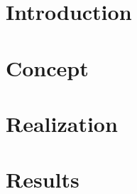 \documentclass[toc=listofnumbered]{doku-tpl}
\begin{document}
        \setcounter{page}{1}
        
			
		\clearpage
		

    	\clearpage
    	\vspace*{-10mm}
    	\tableofcontents
    	
%			  	
        \clearpage
        \fancyhead[L]{\partname \ \thepart \ - \parttitle}	  
        
        
  				
        \part{Introduction}
        
        \clearpage
        
        \part{Concept}
        
        \clearpage
        
                
        \part{Realization}
        
        \clearpage
        
        \part{Results}
        
        \clearpage
  
       
		
        \clearpage
		\fancyhead{}
	 	\fancyhead[R]{\@subject}
	 	
	 	
		
\end{document}
